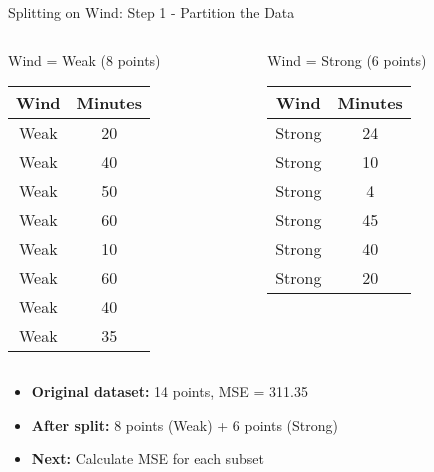 \documentclass[usenames,dvipsnames]{beamer}
\begin{document}
\begin{frame}{Splitting on Wind: Step 1 - Partition the Data}
\begin{columns}
\begin{column}{.5\textwidth}
\begin{examplebox}{Wind = Weak (8 points)}
\scriptsize
\begin{center}
\begin{tabular}{|c|c|}
\hline
\textbf{Wind} & \textbf{Minutes} \\ \hline
Weak & 20 \\
Weak & 40 \\
Weak & 50 \\
Weak & 60 \\
Weak & 10 \\
Weak & 60 \\
Weak & 40 \\
Weak & 35 \\ \hline
\end{tabular}
\end{center}
\end{examplebox}
\end{column}

\begin{column}{.5\textwidth}
\begin{examplebox}{Wind = Strong (6 points)}
\scriptsize
\begin{center}
\begin{tabular}{|c|c|}
\hline
\textbf{Wind} & \textbf{Minutes} \\ \hline
Strong & 24 \\
Strong & 10 \\
Strong & 4 \\
Strong & 45 \\
Strong & 40 \\
Strong & 20 \\ \hline
\end{tabular}
\end{center}
\end{examplebox}
\end{column}
\end{columns}

\vspace{0.3cm}
\begin{itemize}
	\item \textbf{Original dataset:} 14 points, MSE = 311.35
	\item \textbf{After split:} 8 points (Weak) + 6 points (Strong)
	\item \textbf{Next:} Calculate MSE for each subset
\end{itemize}
\end{frame}
\end{document}
